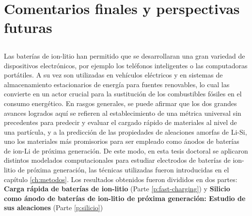 \chapter{Comentarios finales y perspectivas futuras}\label{ch:comentarios}

\section{}

Las baterías de ion-litio han permitido que se desarrollaran una gran variedad de
dispositivos electrónicos, por ejemplo los teléfonos inteligentes o las 
computadoras portátiles. A su vez son utilizadas en vehículos eléctricos y en 
sistemas de almacenamiento estacionarios de energía para fuentes
renovables, lo cual las convierte en un actor crucial para la sustitución de 
los combustibles fósiles en el consumo energético. En rasgos generales, se puede
afirmar que los dos grandes avances logrados aquí se refieren al establecimiento
de una métrica universal sin precedentes para predecir y evaluar el cargado rápido
de materiales al nivel de una partícula, y a la predicción de las propiedades de 
aleaciones amorfas de Li-Si, uno los materiales más promisorios para ser empleado 
como ánodos de baterías de ion-Li de próxima generación. De este modo, en esta 
tesis doctoral se 
aplicaron distintos modelados computacionales para estudiar electrodos de 
baterías de ion-litio de próxima generación, las técnicas utilizadas fueron 
introducidas en el capítulo \ref{ch:metodos}. Los resultados obtenidos fueron 
divididos en dos partes: \textbf{Carga rápida de baterías de ion-litio} (Parte 
\ref{p:fast-charging}) y \textbf{Silicio como ánodo de baterías de ion-litio de 
próxima generación: Estudio de sus aleaciones} (Parte \ref{p:silicio})
